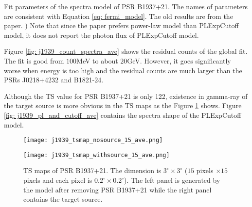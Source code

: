 \documentclass[12pt]{report}
\newcommand{\mycaption}[1]{\protect \caption{#1}}
\begin{document}
        \begin{table}[!ht]
          \centering
            \mycaption{Fit parameters of the spectra model of PSR B1937+21. 
              The names of parameters are consistent with Equation
              \ref{eq: fermi_model}. The old results are from the paper.
              \citep{0004-637X-787-2-167}) Note that since the paper prefers power-law model 
              than PLExpCutoff model, it does not report the photon flux of PLExpCutoff model.}
            \label{table: j1939_fit_result_ave}        
        \end{table} 

        Figure \ref{fig: j1939_count_spectra_ave} shows the residual counts of the global fit.
        The fit is good from $100$MeV to about $20$GeV. However, it goes significantly worse when 
        energy is too high and the residual counts are much larger than the PSRs J0218+4232 and 
        B1821-24.

        Although the TS value for PSR B1937+21 is only 122, existence in gamma-ray of the 
        target source is more obvious in the TS maps as the Figure 
        \ref{fig: j1939_tsmap_comparison_15_ave} shows. Figure 
        \ref{fig: j1939_pl_and_cutoff_ave} contains the spectra shape of the PLExpCutoff model. 

        \begin{figure}[!htp]
          \centering
          \begin{minipage}{0.40\textwidth}
            \begin{center} 
              \texttt{[image: j1939\_tsmap\_nosource\_15\_ave.png]}
            \end{center}
          \end{minipage}
          \begin{minipage}{0.40\textwidth}
            \begin{center}
              \texttt{[image: j1939\_tsmap\_withsource\_15\_ave.png]}
            \end{center}
          \end{minipage}
          \caption{TS maps of PSR B1937+21. The dimension is $3^{\circ} \times 3^{\circ}$
            ($15$ pixels $\times 15$ pixels and each pixel is 
            $0.2^{\circ} \times 0.2^{\circ}$). The left panel is generated by the model 
            after removing PSR B1937+21 while the right panel contains the target source.}
          \label{fig: j1939_tsmap_comparison_15_ave}
        \end{figure}
  
\end{document}
